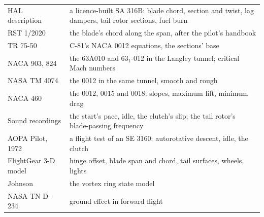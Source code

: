 \documentclass[10pt,a4paper,twocolumn]{article}
\begin{document}
\begin{table}[t]
\begin{tabularx}{\columnwidth}{@{}>{\raggedright\arraybackslash}p{2.3cm}X@{}}
HAL description~\cite{hl} & a licence-built SA 316B: blade chord, section and twist, lag dampers, tail rotor sections, fuel burn \\
RST 1/2020~\cite{rs} & the blade's chord along the span, after the pilot's handbook \\
TR 75-50~\cite{c81} & C-81's NACA 0012 equations, the sections' base \\
NACA 903, 824~\cite{n903,n824} & the 63A010 and 63$_1$-012 in the Langley tunnel; critical Mach numbers \\
NASA TM 4074~\cite{tm4074} & the 0012 in the same tunnel, smooth and rough \\
NACA 460~\cite{n460} & the 0012, 0015 and 0018: slopes, maximum lift, minimum drag \\
Sound recordings & the start's pace, idle, the clutch's slip; the tail rotor's blade-passing frequency \\
AOPA Pilot, 1972~\cite{ao} & a flight test of an SE 3160: autorotative descent, idle, the clutch \\
FlightGear 3-D model & hinge offset, blade span and chord, tail surfaces, wheels, lights \\
Johnson~\cite{johnson} & the vortex ring state model \\
NASA TN D-234~\cite{heyson} & ground effect in forward flight \\
\bottomrule
\end{tabularx}
\end{table}
\end{document}
